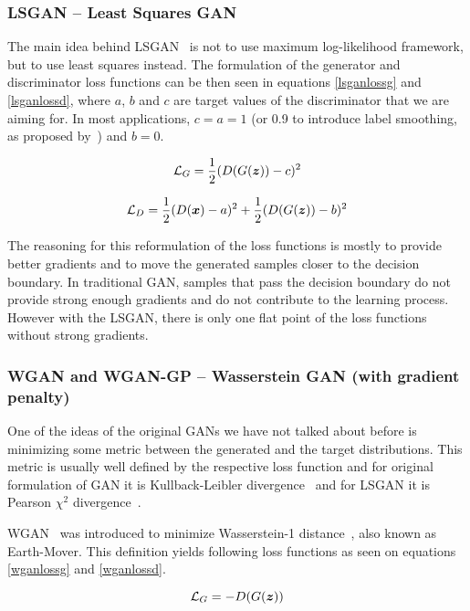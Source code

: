 \subsubsection{LSGAN -- Least Squares GAN}
The main idea behind LSGAN~\cite{lsgan} is not to use maximum log-likelihood framework, but to use least squares instead. The formulation of the generator and discriminator loss functions can be then seen in equations \ref{lsganlossg} and \ref{lsganlossd}, where $a$, $b$ and $c$ are target values of the discriminator that we are aiming for. In most applications, $c = a = 1$ (or 0.9 to introduce label smoothing, as proposed by~\cite{improvedgan,smooth}) and $b = 0$.

\begin{equation}
\mathcal{L}_G = \frac{1}{2}(D(G(\bm{z})) - c)^2
\label{lsganlossg}
\end{equation}

\begin{equation}
\mathcal{L}_D = \frac{1}{2}(D(\bm{x}) - a)^2 + \frac{1}{2}(D(G(\bm{z})) - b)^2
\label{lsganlossd}
\end{equation}

The reasoning for this reformulation of the loss functions is mostly to provide better gradients and to move the generated samples closer to the decision boundary. In traditional GAN, samples that pass the decision boundary do not provide strong enough gradients and do not contribute to the learning process. However with the LSGAN, there is only one flat point of the loss functions without strong gradients.

\subsubsection{WGAN and WGAN-GP -- Wasserstein GAN (with gradient penalty)}

One of the ideas of the original GANs we have not talked about before is minimizing some metric between the generated and the target distributions. This metric is usually well defined by the respective loss function and for original formulation of GAN it is Kullback-Leibler divergence~\cite{kullback} and for LSGAN it is Pearson $\chi^2$ divergence~\cite{pearson}.

WGAN~\cite{wgan} was introduced to minimize Wasserstein-1 distance~\cite{wasser}, also known as Earth-Mover. This definition yields following loss functions as seen on equations \ref{wganlossg} and \ref{wganlossd}.

\begin{equation}
\mathcal{L}_G = -D(G(\bm{z}))
\label{wganlossg}
\end{equation}

